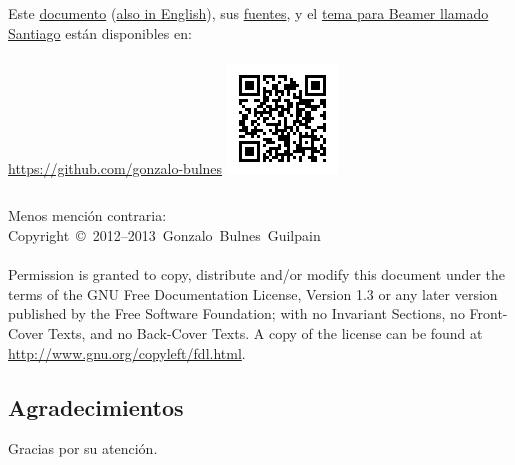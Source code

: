   \begin{frame}{\insertsubsection}

    \footnotesize
      \begin{columns}
          Este \href{https://github.com/gonzalo-bulnes/free-software-to-develop-free-robotics/raw/master/FLOSH-es.pdf}{documento} (\href{https://github.com/gonzalo-bulnes/free-software-to-develop-free-robotics/raw/master/FLOSH.pdf}{also in English}), sus \href{https://github.com/gonzalo-bulnes/free-software-to-develop-free-robotics}{fuentes}, y el \href{https://github.com/gonzalo-bulnes/santiago-beamer-theme}{tema para Beamer llamado Santiago} están disponibles en:\\~\\
          \url{https://github.com/gonzalo-bulnes}    
        \hfill\includegraphics[width=\textwidth]{images/sources-talk.png}
      \end{columns}
    \normalsize

    \scriptsize{Menos mención contraria:}\\
    \noindent\scriptsize{Copyright~\copyright~2012--2013~Gonzalo~Bulnes~Guilpain}\\~\\

    \scriptsize{Permission is granted to copy, distribute and/or modify this document
    under the terms of the GNU Free Documentation License, Version 1.3
    or any later version published by the Free Software Foundation;
    with no Invariant Sections, no Front-Cover Texts, and no Back-Cover Texts.
    A copy of the license can be found at \url{http://www.gnu.org/copyleft/fdl.html}.}
  \end{frame}

%
\subsection{Agradecimientos}

  \begin{frame}
    \vspace{0mm}
    \begin{center}
      Gracias por su atención.     
    \end{center}
  \end{frame}
